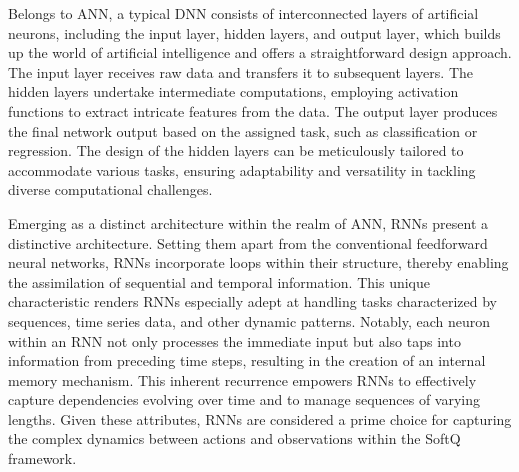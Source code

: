 Belongs to \ac{ANN}, a typical \ac{DNN} consists of interconnected layers of artificial neurons, including the input layer, hidden layers, and output layer, which builds up the world of artificial intelligence and offers a straightforward design approach. The input layer receives raw data and transfers it to subsequent layers. The hidden layers undertake intermediate computations, employing activation functions to extract intricate features from the data. The output layer produces the final network output based on the assigned task, such as classification or regression. The design of the hidden layers can be meticulously tailored to accommodate various tasks, ensuring adaptability and versatility in tackling diverse computational challenges. 

Emerging as a distinct architecture within the realm of \ac{ANN}, \ac{RNN}s present a distinctive architecture. Setting them apart from the conventional feedforward neural networks, \ac{RNN}s incorporate loops within their structure, thereby enabling the assimilation of sequential and temporal information. This unique characteristic renders \ac{RNN}s especially adept at handling tasks characterized by sequences, time series data, and other dynamic patterns. Notably, each neuron within an \ac{RNN} not only processes the immediate input but also taps into information from preceding time steps, resulting in the creation of an internal memory mechanism. This inherent recurrence empowers \ac{RNN}s to effectively capture dependencies evolving over time and to manage sequences of varying lengths. Given these attributes, \ac{RNN}s are considered a prime choice for capturing the complex dynamics between actions and observations within the SoftQ framework.

